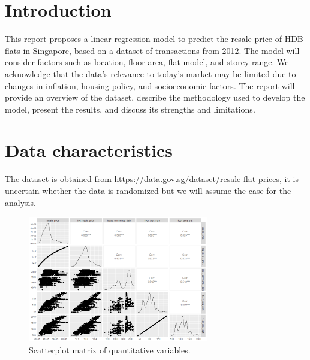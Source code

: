 
\usepackage[a4paper, margin=0.83cm]{geometry}

\sectionfont{\normalsize}
\subsectionfont{\normalsize}
\subsubsectionfont{\small}

\usepackage{draftwatermark}



\maketitle
\pagestyle{empty}

\section{Introduction}

This report proposes a linear regression model to predict the resale price of HDB flats in Singapore, based on a dataset of transactions from 2012. The model will consider factors such as location, floor area, flat model, and storey range. We acknowledge that the data's relevance to today's market may be limited due to changes in inflation, housing policy, and socioeconomic factors. The report will provide an overview of the dataset, describe the methodology used to develop the model, present the results, and discuss its strengths and limitations.

\section{Data characteristics}
The dataset is obtained from \url{https://data.gov.sg/dataset/resale-flat-prices}, it is uncertain whether the data is randomized but we will assume the case for the analysis.
\begin{figure}[!htp]
    \centering
    \includegraphics[width=0.7\textwidth]{images/scatterplotmatrix.png}
    \caption{Scatterplot matrix of quantitative variables.}
    \label{fig:scatterplot matrix}
\end{figure}

